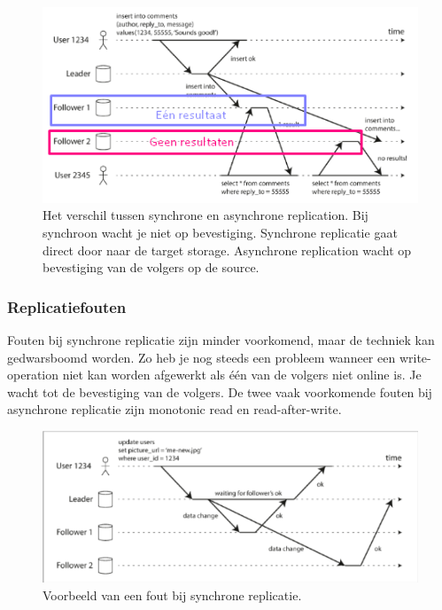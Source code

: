 \documentclass[a4paper,10pt,twoside]{report}
\begin{document}
\begin{figure}
 	\includegraphics[width=\linewidth]{../images/Screenshot_213.png}
 	\caption{Het verschil tussen synchrone en asynchrone replication. Bij synchroon wacht je niet op bevestiging. Synchrone replicatie gaat direct door naar de target storage. Asynchrone replication wacht op bevestiging van de volgers op de source.}
\end{figure}

\subsubsection{Replicatiefouten}

Fouten bij synchrone replicatie zijn minder voorkomend, maar de techniek kan gedwarsboomd worden. Zo heb je nog steeds een probleem wanneer een write-operation niet kan worden afgewerkt als één van de volgers niet online is. Je wacht tot de bevestiging van de volgers. De twee vaak voorkomende fouten bij asynchrone replicatie zijn monotonic read en read-after-write. 

\begin{figure}
	\includegraphics[width=\linewidth]{../images/Screenshot_160.png}
	\caption{Voorbeeld van een fout bij synchrone replicatie.}
\end{figure}
\end{document}
